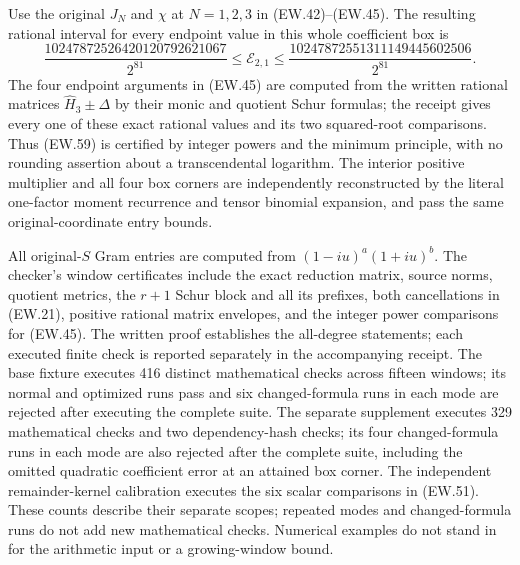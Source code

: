 \documentclass[11pt]{article}
\begin{document}
Use the original $J_N$ and $\chi$ at $N=1,2,3$ in
(EW.42)--(EW.45). The resulting rational interval for every
endpoint value in this whole coefficient box is
\[
 \boxed{\frac{10247872526420120792621067}{2^{81}}
 \le\mathcal E_{2,1}\le
 \frac{10247872551311149445602506}{2^{81}}.}                  \tag{EW.59}
\]
The four endpoint arguments in (EW.45) are computed from the
written rational matrices $\widehat H_3\pm\Delta$ by their
monic and quotient Schur formulas; the receipt gives every one
of these exact rational values and its two squared-root comparisons.
Thus (EW.59) is certified by integer powers and the minimum
principle, with no rounding assertion about a transcendental
logarithm. The interior positive multiplier and all four box
corners are independently reconstructed by the literal one-factor
moment recurrence and tensor binomial expansion, and pass the
same original-coordinate entry bounds.

All original-$S$ Gram entries are computed from
$(1-iu)^a(1+iu)^b$. The checker's window certificates include
the exact reduction matrix, source norms, quotient metrics,
the $r+1$ Schur block and all its prefixes, both cancellations
in (EW.21), positive rational matrix envelopes, and the integer
power comparisons for (EW.45). The written proof establishes
the all-degree statements; each executed finite check is reported
separately in the accompanying receipt. The base fixture executes
416 distinct mathematical checks across fifteen windows; its normal
and optimized runs pass and six changed-formula runs in each mode
are rejected after executing the complete suite. The separate
supplement executes 329 mathematical checks and two dependency-hash
checks; its four changed-formula runs in each mode are also rejected
after the complete suite, including the omitted quadratic coefficient
error at an attained box corner. The independent remainder-kernel
calibration executes the six scalar comparisons in (EW.51).
These counts describe their separate scopes; repeated modes and
changed-formula runs do not add new mathematical checks. Numerical
examples do not stand in for the arithmetic input or a growing-window bound.
\end{document}
